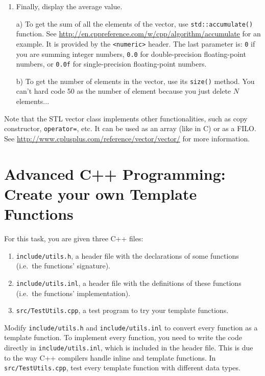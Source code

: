 \begin{enumerate}
\item Finally, display the average value. 

a) To get the sum of all the elements of the vector, use \verb+std::accumulate()+ function. 
See \url{http://en.cppreference.com/w/cpp/algorithm/accumulate} for an example. 
It is provided by the \verb+<numeric>+ header. 
The last parameter is:
\verb+0+ if you are summing integer numbers,
\verb+0.0+ for double-precision floating-point numbers, or 
\verb+0.0f+ for single-precision floating-point numbers.

b) To get the number of elements in the vector, use its \verb+size()+ method. You can't hard code 50 as the number of element because you just delete $N$ elements...
\end{enumerate}

Note that the STL vector class implements other functionalities, such as copy constructor, \verb+operator=+, etc. It can be used as an array (like in C) or as a FILO. See \url{http://www.cplusplus.com/reference/vector/vector/} for more information.


\section{Advanced C++ Programming: Create your own Template Functions}

For this task, you are given three C++ files:
\begin{enumerate}
  \item \verb+include/utils.h+, a header file with the declarations of some functions (i.e.~the functions' signature).
  \item \verb+include/utils.inl+, a header file with the definitions of these functions (i.e.~the functions' implementation).
  \item \verb+src/TestUtils.cpp+, a test program to try your template functions.
\end{enumerate}

Modify \verb+include/utils.h+ and \verb+include/utils.inl+ to convert every function as a template function. 
To implement every function, you need to write the code directly in \verb+include/utils.inl+, which is included in the header file. 
This is due to the way C++ compilers handle inline and template functions. 
In \verb+src/TestUtils.cpp+, test every template function with different data types.

